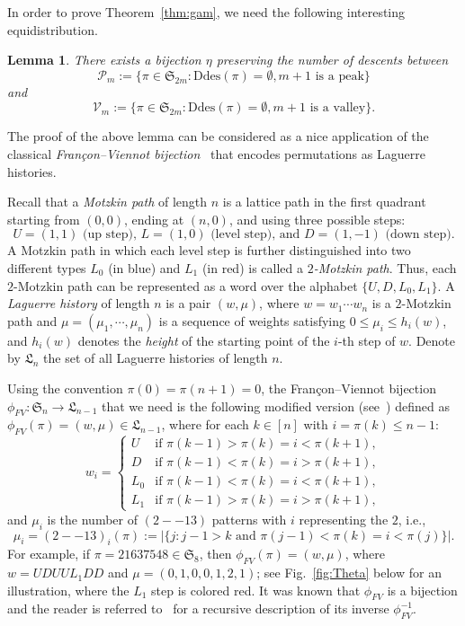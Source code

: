\documentclass[11pt,reqno]{amsart}
\numberwithin{equation}{section}
\theoremstyle{plain}
\newtheorem{lemma}[theorem]{Lemma}
\theoremstyle{definition}
\renewcommand{\S}{\mathfrak{S}}
\def\Ddes{\mathrm{Ddes}}
\def\Lag{\mathfrak{L}}
\def\pp{\operatorname{(2--13)}}
\begin{document}
In order to prove Theorem~\ref{thm:gam}, we need the following interesting equidistribution.

\begin{lemma}\label{bij:fvc}
There exists a bijection $\eta$ preserving the number of descents  between
$$
\mathcal{P}_m:=\{\pi\in\S_{2m}: \Ddes(\pi)=\emptyset, m+1\text{ is a peak}\}
$$
and
$$
\mathcal{V}_m:=\{\pi\in\S_{2m}: \Ddes(\pi)=\emptyset, m+1\text{ is a valley}\}.
$$
\end{lemma}

The proof of the above lemma can be considered as a nice application of the classical  {\em Fran\c{c}on--Viennot bijection}~\cite{Fran} that encodes permutations as Laguerre histories.

Recall that a {\em Motzkin path} of length $n$ is a lattice path in the first  quadrant starting from $(0,0)$, ending at $(n,0)$, and using three possible steps:
 $$
 U=(1,1) \text{ (up step), } L=(1,0) \text{ (level step), and } D=(1,-1) \text{ (down step).}
 $$
A Motzkin path in which each level step is further  distinguished into two different types  $L_0$ (in blue) and $L_1$ (in red) is called a {\em$2$-Motzkin path}.
 Thus, each $2$-Motzkin path can be represented as a word over the alphabet $\{U,D,L_0,L_1\}$. A {\em Laguerre history} of length $n$ is a pair $(w,\mu)$, where $w=w_1\cdots w_n$ is a $2$-Motzkin path and $\mu=(\mu_1,\cdots,\mu_n)$ is a sequence of weights satisfying $0\leq\mu_i\leq h_i(w)$, and $h_i(w)$ denotes  the {\em height} of the starting point of the $i$-th step of $w$. Denote by $\Lag_n$ the set of all Laguerre histories of length $n$.

 Using the convention $\pi(0)=\pi(n+1)=0$, the  Fran\c{c}on--Viennot bijection  $\phi_{FV}:\S_n\rightarrow\Lag_{n-1}$ that we need  is the following modified version (see~\cite{LY}) defined as $\phi_{FV}(\pi)=(w,\mu)\in\Lag_{n-1}$, where for each $k\in[n]$ with $i=\pi(k)\leq n-1$:
$$
  w_i=\left\{
  \begin{array}{ll}
  U& \mbox{if $\pi(k-1)>\pi(k)=i<\pi(k+1)$},  \\
 D&\mbox{if $\pi(k-1)<\pi(k)=i>\pi(k+1)$},  \\
   L_0&\mbox{if $\pi(k-1)<\pi(k)=i<\pi(k+1)$},\\
  L_1 &\mbox{if $\pi(k-1)>\pi(k)=i>\pi(k+1)$},
  \end{array}
  \right.
  $$
  and $\mu_i$ is the number of $\pp$ patterns with $i$ representing the $2$, i.e.,
$$\mu_i=\pp_i(\pi):=|\{j: j-1>k\text{ and } \pi(j-1)<\pi(k)=i<\pi(j)\}|.$$
For example, if $\pi=21637548\in\S_8$, then $\phi_{FV}(\pi)=(w,\mu)$, where $w=UDUUL_1DD$ and $\mu=(0,1,0,0,1,2,1)$; see Fig.~\ref{fig:Theta} below for an illustration, where the $L_1$ step is colored red. It was known that $\phi_{FV}$ is a bijection and the reader is referred to~\cite{LY} for a recursive description of its inverse $\phi_{FV}^{-1}$.
\end{document}
